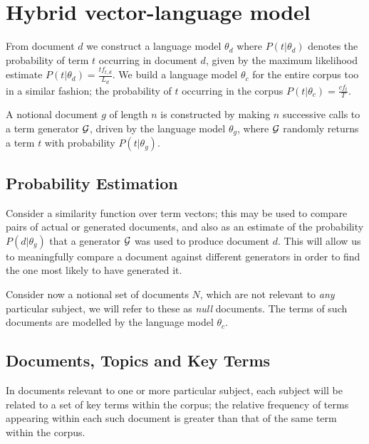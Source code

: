 \section{Hybrid vector-language model}
From document $d$ we construct a language model $\theta_d$ where $P(t|\theta_d)$ denotes the probability of term $t$ occurring in document $d$, given by the maximum likelihood estimate $P(t|\theta_d) = \frac{tf_{t, d}}{L_d}$. We build a language model $\theta_c$ for the entire corpus too in a similar fashion; the probability of $t$ occurring in the corpus $P(t|\theta_c) = \frac{cf_t}{T}$.

A notional document $g$ of length $n$ is constructed by making $n$ successive calls to a term generator $\mathcal{G}$, driven by the language model $\theta_g$, where $\mathcal{G}$ randomly returns a term $t$ with probability $P(t|\theta_g)$. 

\subsection{Probability Estimation}

Consider a similarity function over term vectors; this may be used to compare pairs of actual or generated documents, and also 
as an estimate of the probability $P(d|\theta_g)$ that a generator $\mathcal{G}$ was used to produce document $d$. This will allow us to meaningfully compare a document against different generators in order to find the one most likely to have generated it.

Consider now a notional set of documents $N$, which are not relevant to \emph{any} particular subject, we will refer to these as \emph{null} documents.  The terms of such documents are modelled by the language model $\theta_c$.

\subsection{Documents, Topics and Key Terms}
In documents relevant to one or more particular subject, each subject will be related to a set of key terms within the corpus; the relative frequency of terms appearing within each such document is greater than that of the same term within the corpus.

